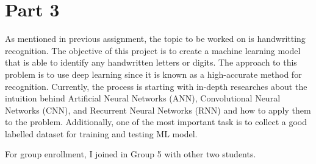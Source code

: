 \documentclass[conference]{IEEEtran}
\begin{document}
\clearpage

\section{Part 3}

As mentioned in previous assignment, the topic to be worked on is handwritting recognition. The objective of this project is to create a machine learning model that is able to identify any handwritten letters or digits. The approach to this problem is to use deep learning since it is known as a high-accurate method for recognition. Currently, the process is starting with in-depth researches about the intuition behind Artificial Neural Networks (ANN), Convolutional Neural Networks (CNN), and Recurrent Neural Networks (RNN) and how to apply them to the problem. Additionally, one of the most important task is to collect a good labelled dataset for training and testing ML model. 

For group enrollment, I joined in Group 5 with other two students.
\end{document}
